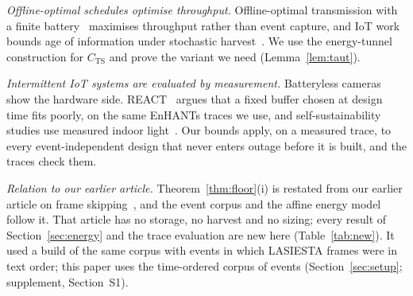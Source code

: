 \emph{Offline-optimal schedules optimise throughput.} Offline-optimal transmission with a finite battery~\cite{tutuncuoglu2012twc,yang2012tcom} maximises throughput rather than event capture, and IoT work bounds age of information under stochastic harvest~\cite{lei2025iotj,botirov2026iotj}. We use the energy-tunnel construction for $C_{\mathrm{TS}}$ and prove the variant we need (Lemma~\ref{lem:taut}).

\emph{Intermittent IoT systems are evaluated by measurement.} Batteryless cameras~\cite{desai2022camaroptera} show the hardware side. REACT~\cite{williams2024react} argues that a fixed buffer chosen at design time fits poorly, on the same EnHANTs traces we use, and self-sustainability studies use measured indoor light~\cite{mayer2024iotj}. Our bounds apply, on a measured trace, to every event-independent design that never enters outage before it is built, and the traces check them.

\emph{Relation to our earlier article.} Theorem~\ref{thm:floor}(i) is restated from our earlier article on frame skipping~\cite[Thms.~4--5]{deep3_jiot2026}, and the event corpus and the affine energy model follow it. That article has no storage, no harvest and no sizing; every result of Section~\ref{sec:energy} and the trace evaluation are new here (Table~\ref{tab:new}). It used a build of the same corpus with \VoneNev{} events in which LASIESTA frames were in text order; this paper uses the time-ordered corpus of \nEv{} events (Section~\ref{sec:setup}; supplement, Section~S1).

